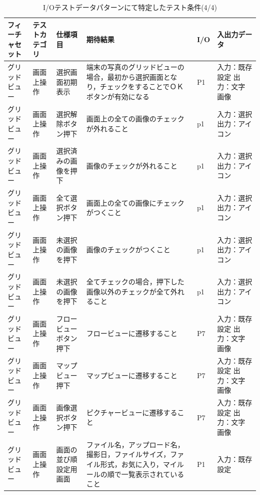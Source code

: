     \begin{table}[htbp]
      \scriptsize
      \centering
      \caption{I/Oテストデータパターンにて特定したテスト条件(4/4)}
      \begin{tabular}{|p{8em}|p{7em}|p{9em}|p{9em}|p{3em}|p{12em}|}
    \cline{1-6}   フィーチャセット & テストカテゴリ  & 仕様項目 & 期待結果  & I/O   & 入出力データ \bigstrut\\
        \hline
    \multicolumn{1}{|l|}{グリッドビュー} & 画面上操作 & 選択画面初期表示 & 端末の写真のグリッドビューの場合，最初から選択画面となり，チェックをすることでＯＫボタンが有効になる & P1    & 入力：既存設定
出力：文字　画像 \bigstrut\\
    \hline
    \multicolumn{1}{|l|}{グリッドビュー} & 画面上操作 & 選択解除ボタン押下 & 画面上の全ての画像のチェックが外れること & p1    & 入力：選択
出力：アイコン \bigstrut\\
    \hline
    \multicolumn{1}{|l|}{グリッドビュー} & 画面上操作 & \multicolumn{1}{p{7.5em}|}{選択済みの画像を押下} & 画像のチェックが外れること & p1    & 入力：選択
出力：アイコン \bigstrut\\
    \hline
    \multicolumn{1}{|l|}{グリッドビュー} & 画面上操作 & 全て選択ボタン押下 & 画面上の全ての画像にチェックがつくこと & p1    & 入力：選択
出力：アイコン \bigstrut\\
    \hline
    \multicolumn{1}{|l|}{グリッドビュー} & 画面上操作 & 未選択の画像を押下 & 画像のチェックがつくこと & p1    & 入力：選択
出力：アイコン \bigstrut\\
    \hline
    \multicolumn{1}{|l|}{グリッドビュー} & 画面上操作 & 未選択の画像を押下 & 全てチェックの場合，押下した画像以外のチェックが全て外れること & p1    & 入力：選択
出力：アイコン \bigstrut\\
    \hline
    \multicolumn{1}{|l|}{グリッドビュー} & 画面上操作 & フロービューボタン押下 & フロービューに遷移すること & P7    & 入力：既存設定
出力：文字　画像 \bigstrut\\
    \hline
    \multicolumn{1}{|l|}{グリッドビュー} & 画面上操作 & マップビュー押下 & マップビューに遷移すること & P7    & 入力：既存設定
出力：文字　画像 \bigstrut\\
    \hline
    \multicolumn{1}{|l|}{グリッドビュー} & 画面上操作 & 画像選択ボタン押下 & ピクチャービューに遷移すること & P7    & 入力：既存設定
出力：文字　画像 \bigstrut\\
    \hline
    \multicolumn{1}{|l|}{グリッドビュー} & 画面上操作 & 画面の並び順設定用画面 & ファイル名，アップロード名，撮影日，ファイルサイズ，ファイル形式，お気に入り，マイルールの順で一覧表示されていること & P1    & 入力：既存設定

\end{tabular}
\end{table}
